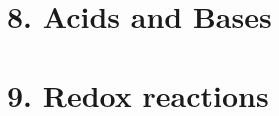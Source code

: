\documentclass{cheatsheet}
\begin{document}
\section{8. Acids and Bases}
	

\section{9. Redox reactions}
	
\end{document}
